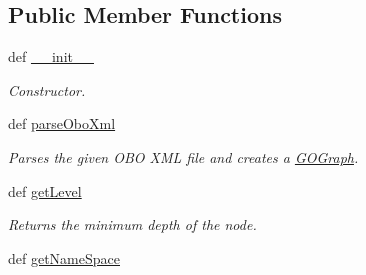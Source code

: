 \subsection*{Public Member Functions}
\begin{DoxyCompactItemize}
\item 
def \hyperlink{classgographer_1_1_g_o_graph_1_1_g_o_graph_a24d8db0ef400bef39324bc804fa34eb4}{\-\_\-\-\_\-init\-\_\-\-\_\-}
\begin{DoxyCompactList}\small\item\em Constructor. \end{DoxyCompactList}\item 
def \hyperlink{classgographer_1_1_g_o_graph_1_1_g_o_graph_acb1ecdd7498c7fcfbfe916fcf73e675a}{parse\-Obo\-Xml}
\begin{DoxyCompactList}\small\item\em Parses the given O\-B\-O X\-M\-L file and creates a \hyperlink{classgographer_1_1_g_o_graph_1_1_g_o_graph}{G\-O\-Graph}. \end{DoxyCompactList}\item 
def \hyperlink{classgographer_1_1_g_o_graph_1_1_g_o_graph_af470097f7034f398a1d77576f1900358}{get\-Level}
\begin{DoxyCompactList}\small\item\em Returns the minimum depth of the node. \end{DoxyCompactList}\item 
\hypertarget{classgographer_1_1_g_o_graph_1_1_g_o_graph_a28ed46813dc6e35385084853cd48ce13}{def \hyperlink{classgographer_1_1_g_o_graph_1_1_g_o_graph_a28ed46813dc6e35385084853cd48ce13}{get\-Name\-Space}}\label{classgographer_1_1_g_o_graph_1_1_g_o_graph_a28ed46813dc6e35385084853cd48ce13}


\end{DoxyCompactItemize}
